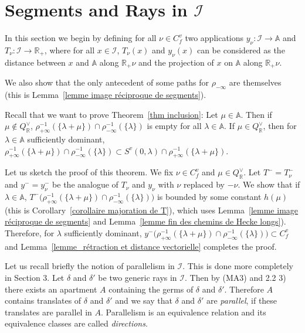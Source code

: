 \documentclass[12pt]{article}
\theoremstyle{plain}
\theoremstyle{definition}
\newcommand{\R}{\mathbb{R}}
\newcommand{\A}{\mathbb{A}}
\newcommand{\I}{\mathcal{I}}
\begin{document}
\section{Segments and Rays in $\I$}\label{sect preliminaries}

In this section we begin by defining for all $\nu\in C_f^v$ two applications $y_\nu:\I\rightarrow \A$ and $T_\nu:\I\rightarrow \R_+$, where for all $x\in \I$, $T_\nu(x)$ and $y_\nu(x)$ can be considered as the distance between $x$ and $\A$ along $\R_+\nu$ and the projection of $x$ on $\A$ along $\R_+\nu$. 

We also show that the only antecedent of some paths for $\rho_{-\infty}$ are themselves (this is Lemma~\ref{lemme image réciproque de segments}).

\medskip
Recall that we want to prove Theorem~\ref{thm inclusion}: Let $\mu\in \A$. Then if $\mu\notin Q_{\R}^\vee$, $\rho_{+\infty}^{-1}(\{\lambda+\mu\})\cap \rho_{-\infty}^{-1}(\{\lambda\})$ is empty for all $\lambda\in \A$. If $\mu\in Q^\vee_{\R}$, then for $\lambda\in \A$ sufficiently dominant, $\rho_{+\infty}^{-1}(\{\lambda+\mu\})\cap \rho_{-\infty}^{-1}(\{\lambda\})\subset S^v(0,\lambda)\cap \rho_{+\infty}^{-1}(\{\lambda+\mu\}) $.





Let us sketch the proof of this theorem. We fix $\nu\in C_f^v$ and $\mu\in Q^\vee_\R$. Let $T^-=T_{\nu}^-$ and $y^-=y_\nu^-$ be the analogue of $T_\nu$ and $y_\nu$ with $\nu$ replaced by $-\nu$. We show that if $\lambda\in \A$, $T^-\big(\rho_{+\infty}^{-1}(\{\lambda+\mu\})\cap \rho_{-\infty}^{-1}(\{\lambda\})\big)$ is bounded by some constant $h(\mu)$ (this is Corollary~\ref{corollaire majoration de T}), which uses Lemma~\ref{lemme image réciproque de segments} and Lemma~\ref{lemme fin des chemins de Hecke longs}). Therefore, for $\lambda$ sufficiently dominant, $y^-\big(\rho_{+\infty}^{-1}(\{\lambda+\mu\})\cap \rho_{-\infty}^{-1}(\{\lambda\})\big)\subset C_f^v$ and Lemma~\ref{lemme_rétraction et distance vectorielle} completes the proof.

\medskip
Let us recall briefly the notion of parallelism in $\I$. This is done more completely in \cite{rousseau2011masures} Section 3. Let $\delta$ and $\delta'$ be two generic rays in $\I$. Then by (MA3) and \cite{rousseau2011masures} 2.2 3) there exists an apartment $A$ containing the germs of $\delta$ and $\delta'$. Therefore $A$ contains translates of $\delta$ and $\delta'$ and we say that $\delta$ and $\delta'$ are \textit{parallel}, if these translates are parallel in $A$. Parallelism is an equivalence relation and its equivalence classes are called \textit{directions}.
\end{document}
